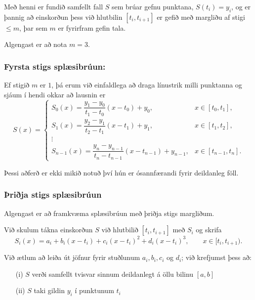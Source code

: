\documentclass[icelandic,a4paper,12pt]{article}
\begin{document}
\pause
\smallskip
Með henni er fundið
samfellt fall $S$ sem brúar gefnu punktana, $S(t_i)=y_i$, og er þannig
að einskorðun þess við hlutbilin $[t_i,t_{i+1}]$ er gefið með margliðu
af stigi $\leq m$, þar sem $m$ er fyrirfram gefin tala. 

\pause
\smallskip
Algengast er að nota $m=3$.


\subsubsection{Fyrsta stigs splæsibrúun:} 
Ef stigið $m$ er $1$, þá erum við einfaldlega að draga línustrik milli punktanna og sjáum í hendi okkar að lausnin er
\begin{equation*}
	S(x) = \begin{cases}
		S_0(x) = \dfrac {y_1-y_0}{t_1-t_0}(x-t_0)+y_0, 
			& x \in [t_0,t_1],\\
		S_1(x) = \dfrac {y_2-y_1}{t_2-t_1}(x-t_1)+y_1, 
			& x \in [t_1,t_2],\\
		\vdots & \\
		S_{n-1}(x) = \dfrac {y_n-y_{n-1}}{t_n-t_{n-1}}
			(x-t_{n-1})+y_{n-1}, &x \in [t_{n-1},t_n].
	\end{cases}
\end{equation*}

\pause
\smallskip
Þessi aðferð er ekki mikið notuð því hún er ósannfærandi fyrir
deildanleg föll.


\subsubsection{Þriðja stigs splæsibrúun} 
Algengast er að framkvæma splæsibrúun með þriðja stigs margliðum. 

\pause
\smallskip
Við skulum tákna einskorðun $S$ við hlutbilið $[t_i,t_{i+1}]$ með $S_i$ og
skrifa 
\begin{equation*}
	S_i(x) = a_i+b_i(x-t_i)+c_i(x-t_i)^2+d_i(x-t_i)^3, 
		\qquad x\in [t_i,t_{i+1}).
\end{equation*}

\pause
\smallskip
Við ætlum að leiða út jöfnur fyrir stuðlunum $a_i, b_i, c_i$ og $d_i$;
við krefjumst þess að: 

\begin{enumerate}
\item[(i)] $S$ verði samfellt tvisvar sinnum deildanlegt á
öllu bilinu $[a,b]$
\item[(ii)] $S$ taki gildin $y_i$ í punktunum $t_i$ 
\end{enumerate}
\end{document}
